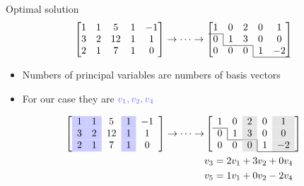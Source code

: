 \documentclass[fullscreen=true, bookmarks=true, hyperref={pdfencoding=unicode}]{beamer}
\begin{document}
\begin{frame}{Optimal solution}
  $$\left[\begin{matrix}
    1 & 1 & 5 & 1 & -1 \\
    3 & 2 & 12 & 1 & 1 \\
    2 & 1 & 7 & 1 & 0 
  \end{matrix}\right] \to \dots \to
  \left[\begin{matrix}
    1 & 0 & 2 & 0 & 1 \\
    \cline{1-1}
    0 & \multicolumn{1}{|c}{1} & 3 & 0 & 0 \\
    \cline{2-3}
    0 & 0 & 0 & \multicolumn{1}{|c}{1} & -2 \\
    \cline{4-5}
    \end{matrix}\right]$$
    \begin{itemize}
      \item Numbers of principal variables are numbers of basis vectors
      \pause
      \item For our case they are $\color{blue!60}v_1, v_2, v_4$
    \end{itemize}
    \begin{align*}
      \left[\begin{array}{>{\columncolor{blue!20}}c >{\columncolor{blue!20}}c c >{\columncolor{blue!20}}c c}
        1 & 1 & 5 & 1 & -1 \\
        3 & 2 & 12 & 1 & 1 \\
        2 & 1 & 7 & 1 & 0 
      \end{array}\right] \to \dots \to 
      &\left[\begin{array}{c c >{\columncolor{gray!20}}c c >{\columncolor{gray!20}}c}
        1 & 0 & 2 & 0 & 1 \\
        \cline{1-1}
        0 & \multicolumn{1}{|c}{1} & 3 & 0 & 0 \\
        \cline{2-3}
        0 & 0 & 0 & \multicolumn{1}{|c}{1} & -2 \\
        \cline{4-5}
        \end{array}\right] \\
        &v_3 = 2v_1 + 3v_2 + 0v_4 \\
        &v_5 = 1v_1 + 0v_2 - 2v_4
    \end{align*}
\end{frame}
\end{document}
